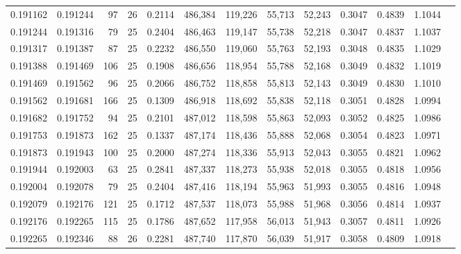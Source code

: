 \begin{tabular}{rrrrrrrrrrrrr}
0.191162 & 0.191244 &    97 &  26 &                                     0.2114 & 486,384 & 119,226 &  55,713 &  52,243 & 0.3047 & 0.4839 & 1.1044 \\
0.191244 & 0.191316 &    79 &  25 &                                     0.2404 & 486,463 & 119,147 &  55,738 &  52,218 & 0.3047 & 0.4837 & 1.1037 \\
0.191317 & 0.191387 &    87 &  25 &                                     0.2232 & 486,550 & 119,060 &  55,763 &  52,193 & 0.3048 & 0.4835 & 1.1029 \\
0.191388 & 0.191469 &   106 &  25 &                                     0.1908 & 486,656 & 118,954 &  55,788 &  52,168 & 0.3049 & 0.4832 & 1.1019 \\
0.191469 & 0.191562 &    96 &  25 &                                     0.2066 & 486,752 & 118,858 &  55,813 &  52,143 & 0.3049 & 0.4830 & 1.1010 \\
0.191562 & 0.191681 &   166 &  25 &                                     0.1309 & 486,918 & 118,692 &  55,838 &  52,118 & 0.3051 & 0.4828 & 1.0994 \\
0.191682 & 0.191752 &    94 &  25 &                                     0.2101 & 487,012 & 118,598 &  55,863 &  52,093 & 0.3052 & 0.4825 & 1.0986 \\
0.191753 & 0.191873 &   162 &  25 &                                     0.1337 & 487,174 & 118,436 &  55,888 &  52,068 & 0.3054 & 0.4823 & 1.0971 \\
0.191873 & 0.191943 &   100 &  25 &                                     0.2000 & 487,274 & 118,336 &  55,913 &  52,043 & 0.3055 & 0.4821 & 1.0962 \\
0.191944 & 0.192003 &    63 &  25 &                                     0.2841 & 487,337 & 118,273 &  55,938 &  52,018 & 0.3055 & 0.4818 & 1.0956 \\
0.192004 & 0.192078 &    79 &  25 &                                     0.2404 & 487,416 & 118,194 &  55,963 &  51,993 & 0.3055 & 0.4816 & 1.0948 \\
0.192079 & 0.192176 &   121 &  25 &                                     0.1712 & 487,537 & 118,073 &  55,988 &  51,968 & 0.3056 & 0.4814 & 1.0937 \\
0.192176 & 0.192265 &   115 &  25 &                                     0.1786 & 487,652 & 117,958 &  56,013 &  51,943 & 0.3057 & 0.4811 & 1.0926 \\
0.192265 & 0.192346 &    88 &  26 &                                     0.2281 & 487,740 & 117,870 &  56,039 &  51,917 & 0.3058 & 0.4809 & 1.0918 \\

\end{tabular}
